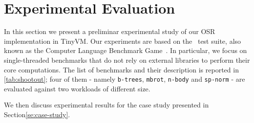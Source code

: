 
\section{Experimental Evaluation}
\label{se:experiments}

In this section we present a preliminar experimental study of our OSR implementation in TinyVM. Our experiments are based on the \shootout\ test suite, also known as the Computer Language Benchmark Game~\cite{shootout}. In particular, we focus on single-threaded benchmarks that do not rely on external libraries to perform their core computations.
The list of benchmarks and their description is reported in \mytable\ref{tab:shootout}; four of them - namely {\tt b-trees}, {\tt mbrot}, {\tt n-body} and {\tt sp-norm} - are evaluated against two workloads of different size.

We then discuss experimental results for the case study presented in Section\mysection\ref{se:case-study}.

